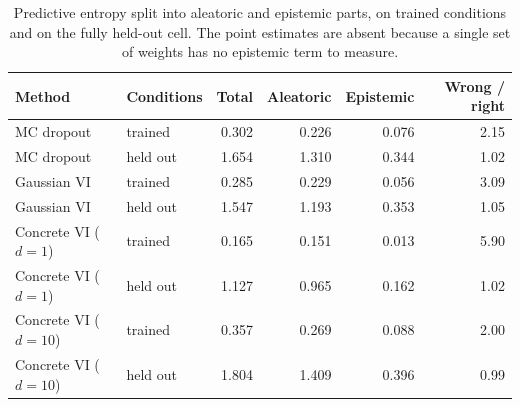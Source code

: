 \begin{table}[!htbp]
\centering
\caption{Predictive entropy split into aleatoric and epistemic parts, on trained conditions and on the fully held-out cell. The point estimates are absent because a single set of weights has no epistemic term to measure.}
\label{tab:uncertainty}
\small
\begin{tabular}{llrrrr}
\toprule
Method & Conditions & Total & Aleatoric & Epistemic & Wrong / right \\
\midrule
MC dropout & trained & 0.302 & 0.226 & 0.076 & 2.15 \\
MC dropout & held out & 1.654 & 1.310 & 0.344 & 1.02 \\
\addlinespace
Gaussian VI & trained & 0.285 & 0.229 & 0.056 & 3.09 \\
Gaussian VI & held out & 1.547 & 1.193 & 0.353 & 1.05 \\
\addlinespace
Concrete VI ($d{=}1$) & trained & 0.165 & 0.151 & 0.013 & 5.90 \\
Concrete VI ($d{=}1$) & held out & 1.127 & 0.965 & 0.162 & 1.02 \\
\addlinespace
Concrete VI ($d{=}10$) & trained & 0.357 & 0.269 & 0.088 & 2.00 \\
Concrete VI ($d{=}10$) & held out & 1.804 & 1.409 & 0.396 & 0.99 \\
\bottomrule
\end{tabular}
\end{table}
